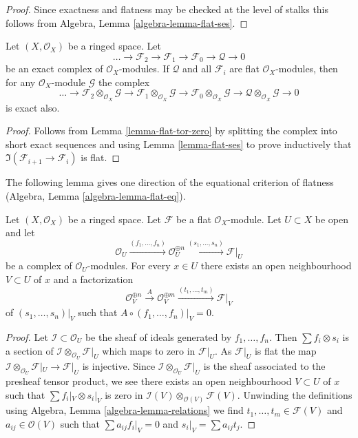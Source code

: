 \begin{proof}
Since exactness and flatness may be checked at the level of stalks
this follows from
Algebra, Lemma \ref{algebra-lemma-flat-ses}.
\end{proof}

\begin{lemma}
\label{lemma-flat-resolution-of-flat}
Let $(X, \mathcal{O}_X)$ be a ringed space.
Let
$$
\ldots \to
\mathcal{F}_2 \to
\mathcal{F}_1 \to
\mathcal{F}_0 \to
\mathcal{Q} \to 0
$$
be an exact complex of $\mathcal{O}_X$-modules.
If $\mathcal{Q}$ and all $\mathcal{F}_i$ are flat $\mathcal{O}_X$-modules,
then for any $\mathcal{O}_X$-module $\mathcal{G}$ the complex
$$
\ldots \to
\mathcal{F}_2 \otimes_{\mathcal{O}_X} \mathcal{G} \to
\mathcal{F}_1 \otimes_{\mathcal{O}_X} \mathcal{G} \to
\mathcal{F}_0 \otimes_{\mathcal{O}_X} \mathcal{G} \to
\mathcal{Q} \otimes_{\mathcal{O}_X} \mathcal{G} \to 0
$$
is exact also.
\end{lemma}

\begin{proof}
Follows from Lemma \ref{lemma-flat-tor-zero} by splitting the complex
into short exact sequences and using Lemma \ref{lemma-flat-ses} to
prove inductively that $\Im(\mathcal{F}_{i + 1} \to \mathcal{F}_i)$
is flat.
\end{proof}

\noindent
The following lemma gives one direction of the equational criterion of
flatness (Algebra, Lemma \ref{algebra-lemma-flat-eq}).

\begin{lemma}
\label{lemma-flat-eq}
Let $(X, \mathcal{O}_X)$ be a ringed space. Let $\mathcal{F}$ be a flat
$\mathcal{O}_X$-module. Let $U \subset X$ be open and let
$$
\mathcal{O}_U \xrightarrow{(f_1, \ldots, f_n)}
\mathcal{O}_U^{\oplus n} \xrightarrow{(s_1, \ldots, s_n)}
\mathcal{F}|_U
$$
be a complex of $\mathcal{O}_U$-modules. For every $x \in U$ there
exists an open neighbourhood $V \subset U$ of $x$ and a factorization
$$
\mathcal{O}_V^{\oplus n}
\xrightarrow{A}
\mathcal{O}_V^{\oplus m} \xrightarrow{(t_1, \ldots, t_m)}
\mathcal{F}|_V
$$
of $(s_1, \ldots, s_n)|_V$ such that $A \circ (f_1, \ldots, f_n)|_V = 0$.
\end{lemma}

\begin{proof}
Let $\mathcal{I} \subset \mathcal{O}_U$ be the sheaf of ideals
generated by $f_1, \ldots, f_n$. Then $\sum f_i \otimes s_i$ is
a section of $\mathcal{I} \otimes_{\mathcal{O}_U} \mathcal{F}|_U$
which maps to zero in $\mathcal{F}|_U$. As $\mathcal{F}|_U$ is flat
the map
$\mathcal{I} \otimes_{\mathcal{O}_U} \mathcal{F}|_U \to \mathcal{F}|_U$
is injective. Since $\mathcal{I} \otimes_{\mathcal{O}_U} \mathcal{F}|_U$
is the sheaf associated to the presheaf tensor product, we see
there exists an open neighbourhood $V \subset U$ of $x$ such
that $\sum f_i|_V \otimes s_i|_V$ is zero in
$\mathcal{I}(V) \otimes_{\mathcal{O}(V)} \mathcal{F}(V)$.
Unwinding the definitions using Algebra, Lemma \ref{algebra-lemma-relations}
we find $t_1, \ldots, t_m \in \mathcal{F}(V)$ and $a_{ij} \in \mathcal{O}(V)$
such that $\sum a_{ij}f_i|_V = 0$ and $s_i|_V = \sum a_{ij}t_j$.
\end{proof}

